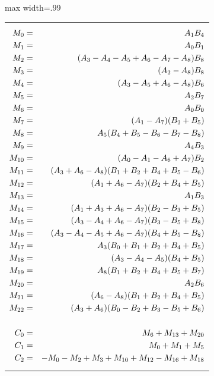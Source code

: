 \documentclass{article}
\begin{document}
\begin{table}[ht!]
    \centering
\begin{adjustbox}{max width=.99\textwidth}
\begin{tabularx}{\textwidth}{X}
\small
\begin{eqnarray*}
M_{0} &=& \phantom{(}A_{1}B_{4}\\
M_{1} &=& \phantom{(}A_{0}B_{1}\\
M_{2} &=& (A_{3}-A_{4}-A_{5}+A_{6}-A_{7}-A_{8})B_{8}\\
M_{3} &=& (A_{2}-A_{8})B_{8}\\
M_{4} &=& (A_{3}-A_{5}+A_{6}-A_{8})B_{6}\\
M_{5} &=& \hphantom{(}A_{2}B_{7}\\
M_{6} &=& \hphantom{(}A_{0}B_{0}\\
M_{7} &=& (A_{1}-A_{7})(B_{2}+B_{5})\\
M_{8} &=& \phantom{(}A_{5}(B_{4}+B_{5}-B_{6}-B_{7}-B_{8})\\
M_{9} &=& \phantom{(}A_{4}B_{3}\\
M_{10} &=& (A_{0}-A_{1}-A_{6}+A_{7})B_{2}\\
M_{11} &=& (A_{3}+A_{6}-A_{8})(B_{1}+B_{2}+B_{4}+B_{5}-B_{6})\\
M_{12} &=& (A_{1}+A_{6}-A_{7})(B_{2}+B_{4}+B_{5})\\
M_{13} &=& \phantom{(}A_{1}B_{3}\\
M_{14} &=& (A_{1}+A_{3}+A_{6}-A_{7})(B_{2}-B_{3}+B_{5})\\
M_{15} &=& (A_{3}-A_{4}+A_{6}-A_{7})(B_{3}-B_{5}+B_{8})\\
M_{16} &=& (A_{3}-A_{4}-A_{5}+A_{6}-A_{7})(B_{4}+B_{5}-B_{8})\\
M_{17} &=& \phantom{(}A_{3}(B_{0}+B_{1}+B_{2}+B_{4}+B_{5})\\
M_{18} &=& (A_{3}-A_{4}-A_{5})(B_{4}+B_{5})\\
M_{19} &=& \phantom{(}A_{8}(B_{1}+B_{2}+B_{4}+B_{5}+B_{7})\\
M_{20} &=& \phantom{(}A_{2}B_{6}\\
M_{21} &=& (A_{6}-A_{8})(B_{1}+B_{2}+B_{4}+B_{5})\\
M_{22} &=& (A_{3}+A_{6})(B_{0}-B_{2}+B_{3}-B_{5}+B_{6})\\
~\\
C_{0} &=& \phantom{-}M_{6}+M_{13}+M_{20}\\
C_{1} &=& \phantom{-}M_{0}+M_{1}+M_{5}\\
C_{2} &=& -M_{0}-M_{2}+M_{3}+M_{10}+M_{12}-M_{16}+M_{18}\\

\end{eqnarray*}
\end{tabularx}
\end{adjustbox}
\end{table}
\end{document}
